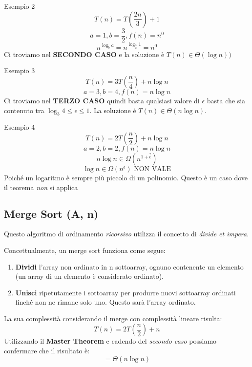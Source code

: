 \documentclass[a4paper]{article}
\begin{document}
\begin{examplebox}{Esempio 2}
       \[T(n) = T\left(\frac{2n}{3}\right) + 1\]
    \[a = 1, b = \frac{3}{2}, f(n) = n^0\]
    \[n^{\log_b a} = n^{\log_{\frac{3}{2}} 1} = n^0\]
    Ci troviamo nel \textbf{SECONDO CASO} e la soluzione è $T(n) \in \Theta(\log n))$
\end{examplebox}

\begin{examplebox}{Esempio 3}
    \[T(n) = 3T\left(\frac{n}{4}\right) + n \log n\]
       \[a = 3, b = 4, f(n) = n \log n\]
       Ci troviamo nel \textbf{TERZO CASO} quindi basta qualsiasi valore di $\epsilon$ basta che sia contenuto tra $\log_3 4 \le \epsilon \le 1$. La soluzione è $T(n) \in \Theta(n\log n)$.
\end{examplebox}

\begin{examplebox}{Esempio 4} 
    \[T(n) = 2T\left(\frac{n}{2}\right) + n \log n\]
       \[a = 2, b = 2, f(n) = n \log n\]
    \[n\log n \in \Omega(n^{1 + \stackrel{?}{\epsilon}}) \]
    \[\log n \in \Omega(n^\epsilon) \text{ NON VALE}\]
    Poiché un logaritmo è sempre più piccolo di un polinomio.
    Questo è un caso dove il teorema \textit{non} si applica
\end{examplebox}


\subsection{Merge Sort (A, n)}

Questo algoritmo di ordinamento \textit{ricorsivo} utilizza il concetto di \textit{divide et impera}. 

Concettualmente, un merge sort funziona come segue:

\begin{enumerate}
    \item \textbf{Dividi} l'array non ordinato in n sottoarray, ognuno contenente un elemento (un array di un elemento è considerato ordinato).
    \item \textbf{Unisci} ripetutamente i sottoarray per produrre nuovi sottoarray ordinati finché non ne rimane solo uno. Questo sarà l'array ordinato.
\end{enumerate}
La sua complessità considerando il merge con complessità lineare risulta:
\[T(n) = 2T\left(\frac{n}{2}\right) + n\]
Utilizzando il \textbf{Master Theorem} e cadendo del \textit{secondo caso} possiamo confermare che il risultato è:
\[= \Theta(n \log n)\]
\end{document}

